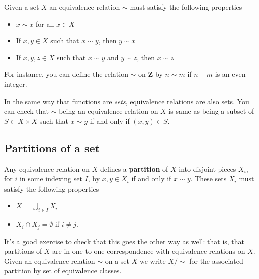 \documentclass[12pt]{article}
\numberwithin{equation}{subsection}
\theoremstyle{note}
\begin{document}
Given a set $X$ an equivalence relation $\sim$ must satisfy the following properties 
\begin{itemize}
	\item $x\sim x$ for all $x\in X$
	\item If $x,y\in X$ such that $x\sim y$, then $y\sim x$
	\item If $x,y,z\in X$ such that $x\sim y$ and $y\sim z$, then $x\sim z$
\end{itemize}

For instance, you can define the relation $\sim$ on $\mathbf{Z}$ by $n\sim m$ if $n-m$ is an even integer. 

In the same way that functions are \textit{sets}, equivalence relations are also sets. You can check that $\sim$ being an equivalence relation on $X$ is same as being a subset of $S\subset X\times X$ such that $x\sim y$ if and only if $(x,y)\in S$. 

\subsection{Partitions of a set} 
Any equivalence relation on $X$ defines a \textbf{partition} of $X$ into disjoint pieces $X_i$, for $i$ in some indexing set $I$, by $x,y\in X_i$ if and only if $x\sim y$. These sets $X_i$ must satisfy the following properties \begin{itemize} 
\item $X=\bigcup_{i\in I} X_i$
\item $X_i\cap X_j=\emptyset$ if $i\neq j$.
\end{itemize}
It's a good exercise to check that this goes the other way as well: that is, that partitions of $X$ are in one-to-one correspondence with equivalence relations on $X$. Given an equivalence relation $\sim$ on a set $X$ we write $X/\sim$ for the associated partition by set of equivalence classes. 
\end{document}
